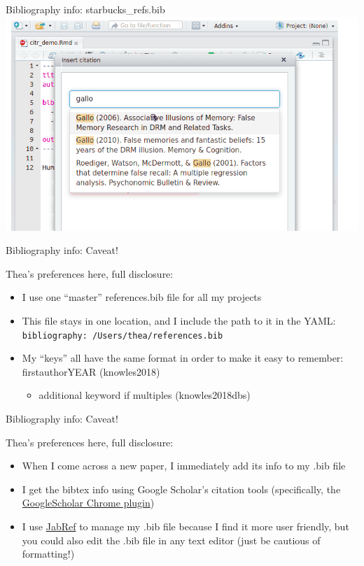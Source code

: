 \documentclass[
  ignorenonframetext,
]{beamer}
\providecommand{\tightlist}{%
  \setlength{\itemsep}{0pt}\setlength{\parskip}{0pt}}
\begin{document}
\begin{frame}[fragile]
\begin{block}{Bibliography info: starbucks\_refs.bib}
\includegraphics{images/citr.png}

\end{block}

\begin{block}{Bibliography info: Caveat!}

Thea's preferences here, full disclosure:

\begin{itemize}
\tightlist
\item
  I use one ``master'' references.bib file for all my projects
\item
  This file stays in one location, and I include the path to it in the
  YAML: \texttt{bibliography:\ /Users/thea/references.bib}
\item
  My ``keys'' all have the same format in order to make it easy to
  remember: firstauthorYEAR (knowles2018)

  \begin{itemize}
  \tightlist
  \item
    additional keyword if multiples (knowles2018dbs)
  \end{itemize}
\end{itemize}

\end{block}

\begin{block}{Bibliography info: Caveat!}

Thea's preferences here, full disclosure:

\begin{itemize}
\tightlist
\item
  When I come across a new paper, I immediately add its info to my .bib
  file
\item
  I get the bibtex info using Google Scholar's citation tools
  (specifically, the
  \href{https://chrome.google.com/webstore/detail/google-scholar-button/ldipcbpaocekfooobnbcddclnhejkcpn?hl=en}{GoogleScholar
  Chrome plugin})
\item
  I use \href{https://sourceforge.net/projects/jabref/}{JabRef} to
  manage my .bib file because I find it more user friendly, but you
  could also edit the .bib file in any text editor (just be cautious of
  formatting!)
\end{itemize}


\end{block}
\end{frame}
\end{document}
